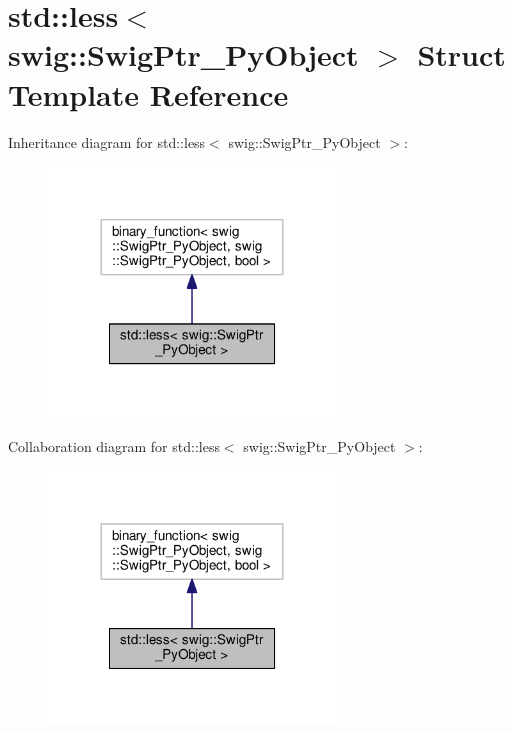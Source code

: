 \hypertarget{structstd_1_1less_3_01swig_1_1SwigPtr__PyObject_01_4}{}\section{std\+:\+:less$<$ swig\+:\+:Swig\+Ptr\+\_\+\+Py\+Object $>$ Struct Template Reference}
\label{structstd_1_1less_3_01swig_1_1SwigPtr__PyObject_01_4}


Inheritance diagram for std\+:\+:less$<$ swig\+:\+:Swig\+Ptr\+\_\+\+Py\+Object $>$\+:\nopagebreak
\begin{figure}[H]
\begin{center}
\leavevmode
\includegraphics[width=216pt]{structstd_1_1less_3_01swig_1_1SwigPtr__PyObject_01_4__inherit__graph}
\end{center}
\end{figure}


Collaboration diagram for std\+:\+:less$<$ swig\+:\+:Swig\+Ptr\+\_\+\+Py\+Object $>$\+:\nopagebreak
\begin{figure}[H]
\begin{center}
\leavevmode
\includegraphics[width=216pt]{structstd_1_1less_3_01swig_1_1SwigPtr__PyObject_01_4__coll__graph}
\end{center}
\end{figure}
